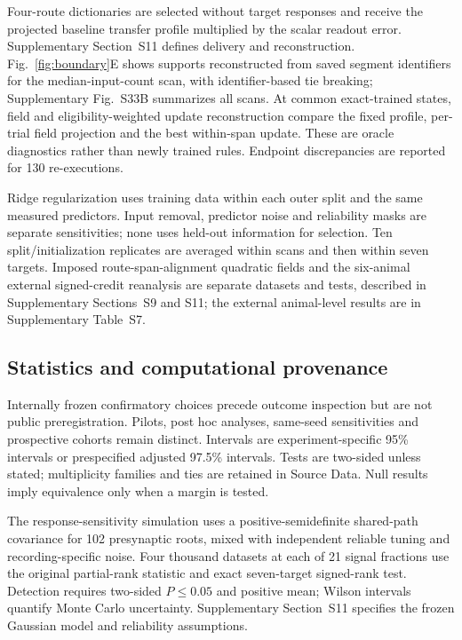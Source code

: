 \documentclass[11pt]{article}
\begin{document}
Four-route dictionaries are selected without target responses and receive the projected baseline transfer profile multiplied by the scalar readout error. Supplementary Section~S11 defines delivery and reconstruction. Fig.~\ref{fig:boundary}E shows supports reconstructed from saved segment identifiers for the median-input-count scan, with identifier-based tie breaking; Supplementary Fig.~S33B summarizes all scans. At common exact-trained states, field and eligibility-weighted update reconstruction compare the fixed profile, per-trial field projection and the best within-span update. These are oracle diagnostics rather than newly trained rules. Endpoint discrepancies are reported for 130 re-executions.

Ridge regularization uses training data within each outer split and the same measured predictors. Input removal, predictor noise and reliability masks are separate sensitivities; none uses held-out information for selection. Ten split/initialization replicates are averaged within scans and then within seven targets. Imposed route-span-alignment quadratic fields and the six-animal external signed-credit reanalysis are separate datasets and tests, described in Supplementary Sections~S9 and S11; the external animal-level results are in Supplementary Table~S7.

\subsection*{Statistics and computational provenance}

Internally frozen confirmatory choices precede outcome inspection but are not public preregistration. Pilots, post hoc analyses, same-seed sensitivities and prospective cohorts remain distinct. Intervals are experiment-specific 95\% intervals or prespecified adjusted 97.5\% intervals. Tests are two-sided unless stated; multiplicity families and ties are retained in Source Data. Null results imply equivalence only when a margin is tested.

The response-sensitivity simulation uses a positive-semidefinite shared-path covariance for 102 presynaptic roots, mixed with independent reliable tuning and recording-specific noise. Four thousand datasets at each of 21 signal fractions use the original partial-rank statistic and exact seven-target signed-rank test. Detection requires two-sided $P\leq0.05$ and positive mean; Wilson intervals quantify Monte Carlo uncertainty. Supplementary Section~S11 specifies the frozen Gaussian model and reliability assumptions.
\end{document}
